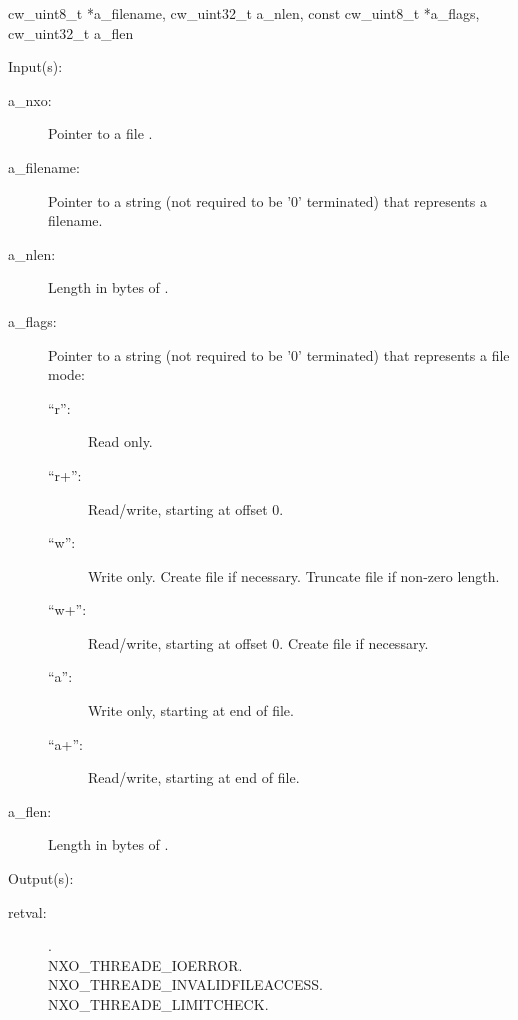\begin{capi}
{{cw\_uint8\_t *a\_filename, cw\_uint32\_t a\_nlen, const cw\_uint8\_t *a\_flags,
cw\_uint32\_t a\_flen}}
	\begin{capilist}
	\item[Input(s): ]
		\begin{description}\item[]
		\item[a\_nxo: ]
			Pointer to a file .
		\item[a\_filename: ]
			Pointer to a string (not required to be '{\bs}0'
			terminated) that represents a filename.
		\item[a\_nlen: ]
			Length in bytes of .
		\item[a\_flags: ]
			Pointer to a string (not required to be '{\bs}0'
			terminated) that represents a file mode:
			\begin{description}\item[]
			\item[``r'': ]
				Read only.
			\item[``r+'': ]
				Read/write, starting at offset 0.
			\item[``w'': ]
				Write only.  Create file if necessary.  Truncate
				file if non-zero length.
			\item[``w+'': ]
				Read/write, starting at offset 0.  Create
				file if necessary.
			\item[``a'': ]
				Write only, starting at end of file.
			\item[``a+'': ]
				Read/write, starting at end of file.
			\end{description}
		\item[a\_flen: ]
			Length in bytes of .
		\end{description}
	\item[Output(s): ]
		\begin{description}\item[]
		\item[retval: ]
			\begin{description}\item[]
			\item[.]
			\item[
				{NXO_THREADE_IOERROR}.]
			\item[
				{NXO_THREADE_INVALIDFILEACCESS}.]
			\item[
				{NXO_THREADE_LIMITCHECK}.]
			\end{description}

\end{description}
\end{capilist}
\end{capi}

